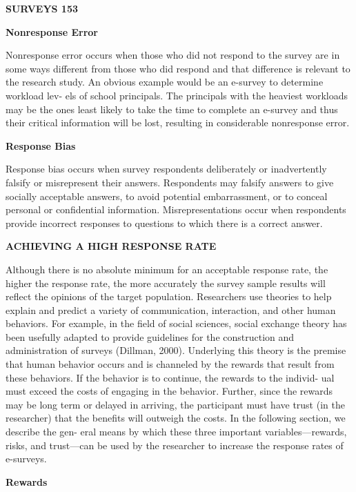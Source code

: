 \documentclass [10pt,a4paper]{book}
\begin{document}
\begin{flushright}
 \textbf{SURVEYS 153}
\end{flushright}

\begin{flushleft}
\textbf{Nonresponse Error}
\end{flushleft}
Nonresponse error occurs when those who did not respond to the survey are in some
ways different from those who did respond and that difference is relevant to the
research study. An obvious example would be an e-survey to determine workload lev-
els of school principals. The principals with the heaviest workloads may be the ones
least likely to take the time to complete an e-survey and thus their critical information
will be lost, resulting in considerable nonresponse error.
\begin{flushleft}
\textbf{Response Bias}
\end{flushleft}
Response bias occurs when survey respondents deliberately or inadvertently falsify or
misrepresent their answers. Respondents may falsify answers to give socially acceptable
answers, to avoid potential embarrassment, or to conceal personal or confidential
information. Misrepresentations occur when respondents provide incorrect responses
to questions to which there is a correct answer.
\begin{flushleft}
\textbf{ACHIEVING A HIGH RESPONSE RATE}
\end{flushleft}
Although there is no absolute minimum for an acceptable response rate, the higher the
response rate, the more accurately the survey sample results will reflect the opinions of
the target population. Researchers use theories to help explain and predict a variety of
communication, interaction, and other human behaviors. For example, in the field of
social sciences, social exchange theory has been usefully adapted to provide guidelines
for the construction and administration of surveys (Dillman, 2000). Underlying this
theory is the premise that human behavior occurs and is channeled by the rewards that
result from these behaviors. If the behavior is to continue, the rewards to the individ-
ual must exceed the costs of engaging in the behavior. Further, since the rewards may
be long term or delayed in arriving, the participant must have trust (in the researcher)
that the benefits will outweigh the costs. In the following section, we describe the gen-
eral means by which these three important variables—rewards, risks, and trust—can be
used by the researcher to increase the response rates of e-surveys.
\begin{flushleft}
\textbf{Rewards}
\end{flushleft}
\end{document}
